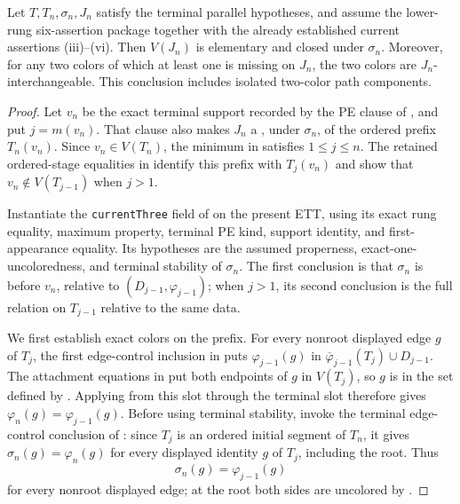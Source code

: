 \begin{helper}
Let $T,T_n,\sigma_n,J_n$ satisfy the terminal parallel hypotheses, and assume
the lower-rung six-assertion package together with the already established
current assertions (iii)--(vi).  Then $V(J_n)$ is elementary and closed under
$\sigma_n$.  Moreover, for any two colors of which at least one is missing on
$J_n$, the two colors are $J_n$-interchangeable.  This conclusion includes
isolated two-color path components.
\end{helper}
\begin{proof}
Let $v_n$ be the exact terminal support recorded by the PE clause of
, and put $j=m(v_n)$.  That clause also makes
$J_n$ a , under $\sigma_n$, of the ordered
prefix $T_n(v_n)$.  Since $v_n\in V(T_n)$, the minimum in
 satisfies $1\leq j\leq n$.
The retained ordered-stage equalities in
 identify this prefix with
$T_j(v_n)$ and show that $v_n\notin V(T_{j-1})$ when $j>1$.

Instantiate the \texttt{currentThree} field of
 on the present ETT, using its exact
rung equality, maximum property, terminal PE kind, support identity, and
first-appearance equality.  Its hypotheses are the assumed properness,
exact-one-uncoloredness, and terminal stability of $\sigma_n$.  The first
conclusion is that $\sigma_n$ is
 before $v_n$, relative to
$(D_{j-1},\varphi_{j-1})$; when $j>1$, its second conclusion is the full
 relation on $T_{j-1}$ relative to the same data.

We first establish exact colors on the prefix.  For every nonroot displayed
edge $g$ of $T_j$, the first edge-control inclusion in
 puts
$\varphi_{j-1}(g)$ in
$\overline\varphi_{j-1}(T_j)\cup D_{j-1}$.  The attachment equations in
 put both endpoints of $g$ in $V(T_j)$, so $g$ is
in the set defined by .  Applying
 from this slot through the terminal
slot therefore gives
$\varphi_n(g)=\varphi_{j-1}(g)$.  Before using terminal stability, invoke
the terminal edge-control conclusion of
: since $T_j$ is an ordered initial
segment of $T_n$, it gives $\sigma_n(g)=\varphi_n(g)$ for every displayed
identity $g$ of $T_j$, including the root.  Thus
\[
 \sigma_n(g)=\varphi_{j-1}(g)                                  \tag{1}
\]
for every nonroot displayed edge; at the root both sides are uncolored by
.


\end{proof}
